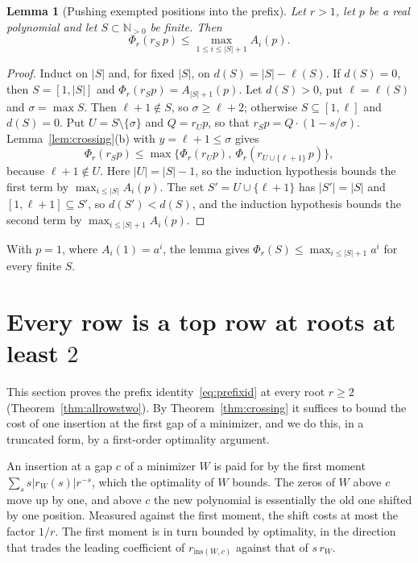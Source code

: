 \documentclass[11pt]{article}
\newtheorem{lemma}[theorem]{Lemma}
\newcommand{\N}{\mathbb N}
\begin{document}
\begin{lemma}[Pushing exempted positions into the prefix]\label{lem:prefixpush}
Let $r>1$, let $p$ be a real polynomial and let $S\subset\N_{>0}$ be finite.
Then
\[
  \Phi_r(r_S\,p)\le\max_{1\le i\le|S|+1}A_i(p).
\]
\end{lemma}

\begin{proof}
Induct on $|S|$ and, for fixed $|S|$, on $d(S)=|S|-\ell(S)$.  If $d(S)=0$,
then $S=[1,|S|]$ and $\Phi_r(r_Sp)=A_{|S|+1}(p)$.  Let $d(S)>0$, put
$\ell=\ell(S)$ and $\sigma=\max S$.  Then $\ell+1\notin S$, so
$\sigma\ge\ell+2$; otherwise $S\subseteq[1,\ell]$ and $d(S)=0$.  Put
$U=S\setminus\{\sigma\}$ and $Q=r_Up$, so that $r_Sp=Q\cdot(1-s/\sigma)$.
Lemma~\ref{lem:crossing}(b) with $y=\ell+1\le\sigma$ gives
\[
  \Phi_r(r_Sp)\le\max\bigl\{\Phi_r(r_Up),\ \Phi_r(r_{U\cup\{\ell+1\}}\,p)\bigr\},
\]
because $\ell+1\notin U$.  Here $|U|=|S|-1$, so the induction hypothesis
bounds the first term by $\max_{i\le|S|}A_i(p)$.  The set
$S'=U\cup\{\ell+1\}$ has $|S'|=|S|$ and $[1,\ell+1]\subseteq S'$, so
$d(S')<d(S)$, and the induction hypothesis bounds the second term by
$\max_{i\le|S|+1}A_i(p)$.
\end{proof}

With $p=1$, where $A_i(1)=a^i$, the lemma gives
$\Phi_r(S)\le\max_{i\le|S|+1}a^i$ for every finite $S$.


\section{Every row is a top row at roots at least \texorpdfstring{$2$}{2}}\label{sec:allrowstwo}

This section proves the prefix identity~\eqref{eq:prefixid} at every root $r\ge2$
(Theorem~\ref{thm:allrowstwo}).  By Theorem~\ref{thm:crossing} it suffices
to bound the cost of one insertion at the first gap of a minimizer, and we
do this, in a truncated form, by a first-order optimality argument.

An insertion at a gap $c$ of a minimizer $W$ is paid for by the first
moment $\sum_ss|r_W(s)|r^{-s}$, which the optimality of $W$ bounds.  The
zeros of $W$ above $c$ move up by one, and above $c$ the new polynomial is
essentially the old one shifted by one position.  Measured against the
first moment, the shift costs at most the factor $1/r$.  The first moment
is in turn bounded by optimality, in the direction that trades the leading
coefficient of $r_{\mathrm{ins}(W,c)}$ against that of $s\,r_W$.
\end{document}
